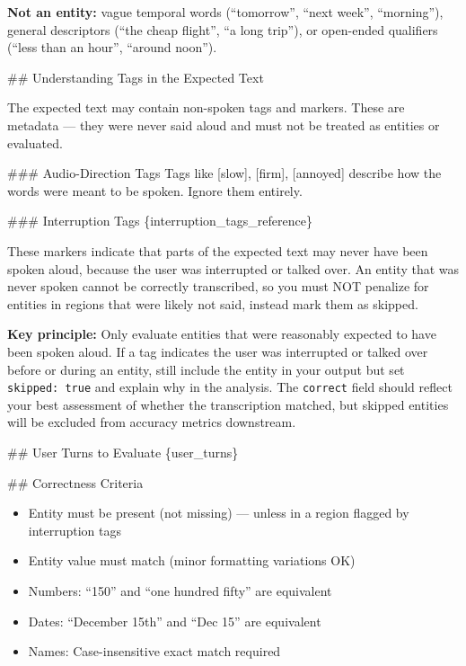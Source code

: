 \begin{tcolorbox}[promptbox, title={\small Transcription Accuracy (Key Entities) Prompt}]
      \textbf{Not an entity:} vague temporal words (``tomorrow'', ``next week'', ``morning''), general descriptors (``the cheap flight'', ``a long trip''), or open-ended qualifiers (``less than an hour'', ``around noon'').\newline

      \#\# Understanding Tags in the Expected Text\newline

      The expected text may contain non-spoken tags and markers. These are metadata --- they were never said aloud and must not be treated as entities or evaluated.\newline

      \#\#\# Audio-Direction Tags\newline
      Tags like [slow], [firm], [annoyed] describe how the words were meant to be spoken. Ignore them entirely.\newline

      \#\#\# Interruption Tags\newline
      \{interruption\_tags\_reference\}\newline

      These markers indicate that parts of the expected text may never have been spoken aloud, because the user was interrupted or talked over. An entity that was never spoken cannot be correctly transcribed, so you must NOT penalize for entities in regions that were likely not said, instead mark them as skipped.\newline

      \textbf{Key principle:} Only evaluate entities that were reasonably expected to have been spoken aloud. If a tag indicates the user was interrupted or talked over before or during an entity, still include the entity in your output but set \texttt{skipped: true} and explain why in the analysis. The \texttt{correct} field should reflect your best assessment of whether the transcription matched, but skipped entities will be excluded from accuracy metrics downstream.\newline

      \#\# User Turns to Evaluate\newline
      \{user\_turns\}\newline

      \#\# Correctness Criteria
      \begin{itemize}
        \item Entity must be present (not missing) --- unless in a region flagged by interruption tags
        \item Entity value must match (minor formatting variations OK)
        \item Numbers: ``150'' and ``one hundred fifty'' are equivalent
        \item Dates: ``December 15th'' and ``Dec 15'' are equivalent
        \item Names: Case-insensitive exact match required
      \end{itemize}


\end{tcolorbox}
